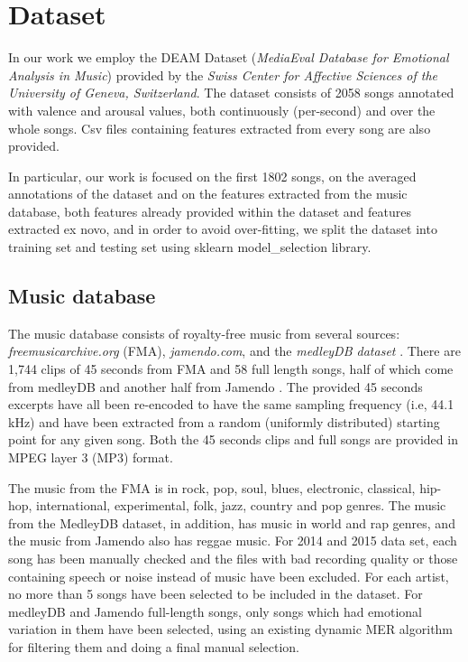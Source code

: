 \section{Dataset}\label{sec:dataset}

In our work we employ the DEAM Dataset (\textit{MediaEval Database for Emotional Analysis in Music}) provided by the \textit{Swiss Center for Affective Sciences of the University of Geneva, Switzerland}.
The dataset consists of 2058 songs annotated with valence and arousal values, both continuously (per-second) and over the whole songs. Csv files containing features extracted from every song are also provided.

In particular, our work is focused on the first 1802 songs, on the averaged annotations of the dataset and on the features extracted from the music database, both features already provided within the dataset and features extracted ex novo, and in order to avoid over-fitting, we split the dataset into training set and testing set using sklearn model\_selection library. 


\subsection{Music database}\label{sec:database}

The music database consists of royalty-free music from several sources: \textit{freemusicarchive.org} (FMA), \textit{jamendo.com}, and the \textit{medleyDB dataset} \cite{bittner2014medleydb}. There are 1,744 clips of 45 seconds from FMA and 58 full length songs, half of which come from medleyDB and another half from Jamendo \cite{aljanaki2017developing}.
The provided 45 seconds excerpts have all been re-encoded to have the same sampling frequency (i.e, 44.1\,kHz) and have been extracted from a random (uniformly distributed) starting point for any given song. Both the 45 seconds clips and full songs are provided in MPEG layer 3 (MP3) format.\cite{soleymani2016deam}

The music from the FMA is in rock, pop, soul, blues, electronic, classical, hip-hop, international, experimental, folk, jazz, country and pop genres. The music from the MedleyDB dataset, in addition, has music in world and rap genres, and the music from Jamendo also has reggae music. For 2014 and 2015 data set, each song has been manually checked and the files with bad recording quality or those containing speech or noise instead of music have been excluded. For each artist, no more than 5 songs have been selected to be included in the dataset. For medleyDB and Jamendo full-length songs, only songs which had emotional variation in them have been selected, using an existing dynamic MER algorithm for filtering them and doing a final manual selection\cite{anna2015emotion}.


